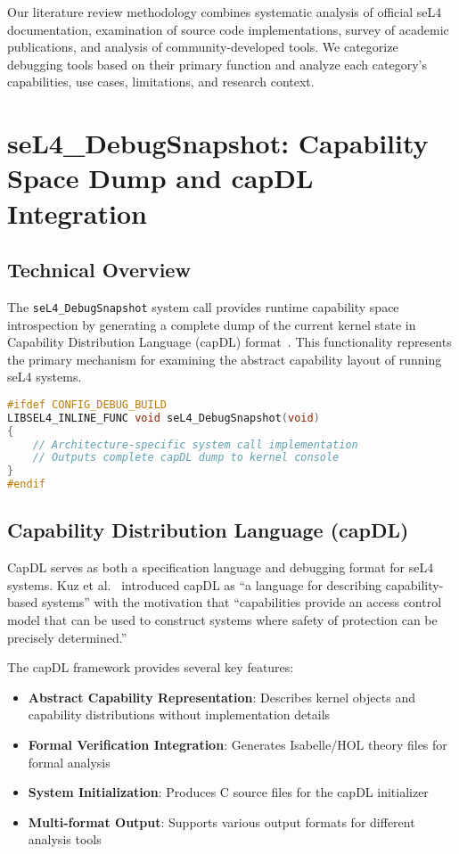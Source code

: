 \documentclass[11pt,a4paper]{article}
\begin{document}
Our literature review methodology combines systematic analysis of official seL4 documentation, examination of source code implementations, survey of academic publications, and analysis of community-developed tools. We categorize debugging tools based on their primary function and analyze each category's capabilities, use cases, limitations, and research context.

\section{seL4\_DebugSnapshot: Capability Space Dump and capDL Integration}

\subsection{Technical Overview}

The \texttt{seL4\_DebugSnapshot} system call provides runtime capability space introspection by generating a complete dump of the current kernel state in Capability Distribution Language (capDL) format~\cite{Kuz2010capdl}. This functionality represents the primary mechanism for examining the abstract capability layout of running seL4 systems.

\begin{lstlisting}[caption=seL4\_DebugSnapshot System Call Interface, language=C]
#ifdef CONFIG_DEBUG_BUILD
LIBSEL4_INLINE_FUNC void seL4_DebugSnapshot(void)
{
    // Architecture-specific system call implementation
    // Outputs complete capDL dump to kernel console
}
#endif
\end{lstlisting}

\subsection{Capability Distribution Language (capDL)}

CapDL serves as both a specification language and debugging format for seL4 systems. Kuz et al.~\cite{Kuz2010capdl} introduced capDL as ``a language for describing capability-based systems'' with the motivation that ``capabilities provide an access control model that can be used to construct systems where safety of protection can be precisely determined.''

The capDL framework provides several key features:
\begin{itemize}
\item \textbf{Abstract Capability Representation}: Describes kernel objects and capability distributions without implementation details
\item \textbf{Formal Verification Integration}: Generates Isabelle/HOL theory files for formal analysis
\item \textbf{System Initialization}: Produces C source files for the capDL initializer
\item \textbf{Multi-format Output}: Supports various output formats for different analysis tools
\end{itemize}
\end{document}
